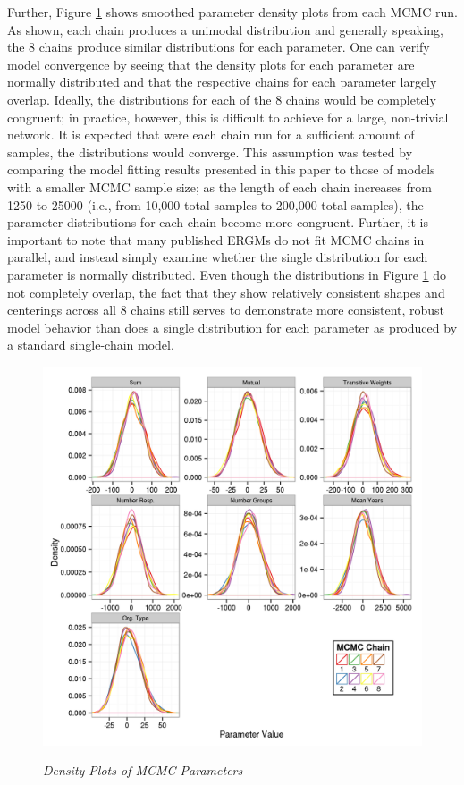 \documentclass[12pt,a4paper,titlepage]{article}
\begin{document}
Further, Figure \ref{figure:densityplots} shows smoothed parameter density plots from each MCMC run. As shown, each chain produces a unimodal distribution and generally speaking, the 8 chains produce similar distributions for each parameter. One can verify model convergence by seeing that the density plots for each parameter are normally distributed and that the respective chains for each parameter largely overlap. Ideally, the distributions for each of the 8 chains would be completely congruent; in practice, however, this is difficult to achieve for a large, non-trivial network. It is expected that were each chain run for a sufficient amount of samples, the distributions would converge. This assumption was tested by comparing the model fitting results presented in this paper to those of models with a smaller MCMC sample size; as the length of each chain increases from 1250 to 25000 (i.e., from 10,000 total samples to 200,000 total samples), the parameter distributions for each chain become more congruent. Further, it is important to note that many published ERGMs do not fit MCMC chains in parallel, and instead simply examine whether the single distribution for each parameter is normally distributed. Even though the distributions in Figure \ref{figure:densityplots} do not completely overlap, the fact that they show relatively consistent shapes and centerings across all 8 chains still serves to demonstrate more consistent, robust model behavior than does a single distribution for each parameter as produced by a standard single-chain model. 

\begin{figure}[!ht]
\caption{\textit{Density Plots of MCMC Parameters}}
\graphicspath{ {`/Users/TScott/Google\space Drive/elwha/PSJ_Submission/Version3'}}
\noindent
\includegraphics[width=6.5in]
{densityplotdu}
\label{figure:densityplots}
\end{figure}
\end{document}
